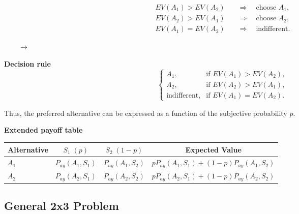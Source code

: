 	\begin{center}
		\begin{minipage}{0.4\textwidth}
			\[
			\begin{aligned}
				EV(A_1)>EV(A_2) &\quad\Rightarrow\quad \text{choose } A_1,\\
				EV(A_2)>EV(A_1) &\quad\Rightarrow\quad \text{choose } A_2,\\
				EV(A_1)=EV(A_2) &\quad\Rightarrow\quad \text{indifferent}.
			\end{aligned}
			\]
		\end{minipage}
		$ \qquad \longrightarrow \qquad$
		\begin{minipage}{0.4\textwidth}
			\textbf{Decision rule}
			\[
			\begin{cases}
				A_1, & \text{if } EV(A_1)>EV(A_2),\\
				A_2, & \text{if } EV(A_2)>EV(A_1),\\
				\text{indifferent}, & \text{if } EV(A_1)=EV(A_2).
			\end{cases}
			\]
		\end{minipage}
	\end{center}
	
	Thus, the preferred alternative can be expressed as a function of the
	subjective probability $p$.
	
	\textbf{Extended payoff table}
	
	\begin{center}
		\small
		\renewcommand{\arraystretch}{1.5}
		\setlength{\tabcolsep}{4pt}
		
		\begin{tabular}{lccc}
			\toprule
			Alternative
			& $S_1\;(p)$
			& $S_2\;(1-p)$
			& Expected Value
			\\
			\midrule
			
			$A_1$
			& $P_{ay}(A_1,S_1)$
			& $P_{ay}(A_1,S_2)$
			&
			$pP_{ay}(A_1,S_1)
			+
			(1-p)P_{ay}(A_1,S_2)$
			\\
			
			$A_2$
			& $P_{ay}(A_2,S_1)$
			& $P_{ay}(A_2,S_2)$
			&
			$pP_{ay}(A_2,S_1)
			+
			(1-p)P_{ay}(A_2,S_2)$
			\\
			
			\bottomrule
		\end{tabular}
		
	\end{center}
	
	\subsection{General 2x3 Problem}\label{sec:c4-intro-2x3}

